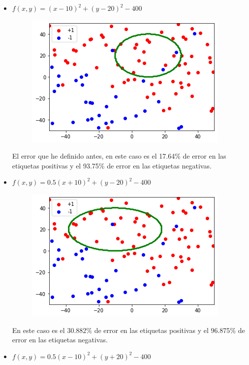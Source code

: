 \documentclass[a4paper,11pt]{article}
\begin{document}
\begin{itemize}

\item $f(x, y) = (x - 10)^2 + (y - 20)^2 - 400$

\begin{figure}[h]
\includegraphics[scale=0.7]{ej2c1}
\centering
\end{figure}

El error que he definido antes, en este caso es el 17.64$\%$ de error en las etiquetas positivas y el 93.75$\%$ de error en las etiquetas negativas.

\item $f(x, y) = 0.5(x + 10)^2 + (y - 20)^2 - 400$

\begin{figure}[h]
\includegraphics[scale=0.7]{ej2c2}
\centering
\end{figure}

En este caso es el 30.882$\%$ de error en las etiquetas positivas y el 96.875$\%$ de error en las etiquetas negativas. 

\newpage

\item $f(x, y) = 0.5(x - 10)^2 + (y + 20)^2 - 400$


\end{itemize}
\end{document}
